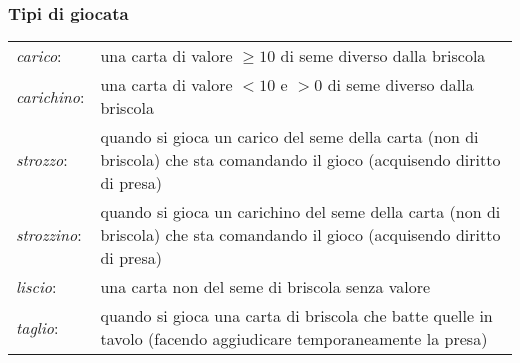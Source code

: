 \subsubsection*{Tipi di giocata}
\vspace{4mm}
\begin{tabular}{l p{}}
\emph{carico}: & una carta di valore $  \geq 10 $ di seme diverso dalla briscola \\
\emph{carichino}: & una carta di valore $  < 10 $ e $ > 0 $ di seme diverso dalla briscola \\
\emph{strozzo}: & quando si gioca un carico del seme della carta (non di briscola) che sta comandando il gioco (acquisendo diritto di presa) \\
\emph{strozzino}: & quando si gioca un carichino del seme della carta (non di briscola) che sta comandando il gioco (acquisendo diritto di presa) \\
\emph{liscio}: & una carta non del seme di briscola senza valore \\
\emph{taglio}: & quando si gioca una carta di briscola che batte quelle in tavolo (facendo aggiudicare temporaneamente la presa) \\

\end{tabular}

